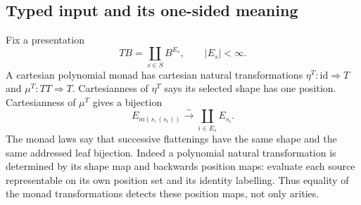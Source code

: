 \documentclass[11pt,a4paper]{article}
\theoremstyle{definition}
\newcommand{\id}{\mathrm{id}}
\begin{document}
\subsection{Typed input and its one-sided meaning}
Fix a presentation
\[
 TB=\coprod_{s\in S}B^{E_s},\qquad |E_s|<\infty.
\]
A cartesian polynomial monad has cartesian natural transformations
$\eta^T:\id\Rightarrow T$ and $\mu^T:TT\Rightarrow T$.
Cartesianness of $\eta^T$ says its selected shape has one position.
Cartesianness of $\mu^T$ gives a bijection
\begin{equation}\label{eq:leaves}
 E_{m(s,(s_i))}\xrightarrow{\sim}\coprod_{i\in E_s}E_{s_i}.
\end{equation}
The monad laws say that successive flattenings have the same shape and the
same addressed leaf bijection. Indeed a polynomial natural transformation is
determined by its shape map and backwards position maps: evaluate each source
representable on its own position set and its identity labelling. Thus equality
of the monad transformations detects these position maps, not only arities.
\end{document}
